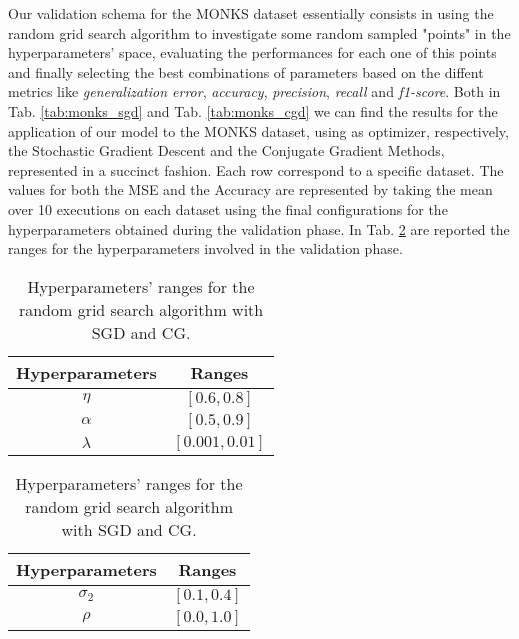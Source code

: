         Our validation schema for the MONKS dataset essentially consists in using the random grid
        search
        algorithm to investigate some random sampled "points" in the hyperparameters' space, evaluating the
        performances for each one of this points and finally selecting the best combinations of parameters
        based
        on the diffent metrics like \textit{generalization error}, \textit{accuracy}, \textit{precision},
        \textit{recall} and \textit{f1-score}. Both in Tab. \ref{tab:monks_sgd} and Tab.
        \ref{tab:monks_cgd} we can find the results for the application of our model to the MONKS dataset,
        using as optimizer, respectively, the Stochastic Gradient Descent and the Conjugate Gradient Methods,
        represented in a succinct fashion. Each row correspond to a specific dataset. The values for both the
        MSE and the Accuracy are represented by taking the mean over 10 executions on each dataset using
        the final configurations for the hyperparameters obtained during the validation phase.
        In Tab. \ref{tab:hyper_monk} are reported the ranges for the hyperparameters involved in the validation phase.

        \begin{table}[H]
          \centering
          \caption{Hyperparameters' ranges for the random grid search algorithm with SGD and CG.}
          \begin{minipage}{.4\textwidth}
              \centering
              \begin{tabular}{| c | c |}
                    \hline
                    Hyperparameters & Ranges\\
                    \hline
                    $\eta$ & $\left [0.6, 0.8 \right ]$ \\
                    \hline
                    $\alpha$ & $[0.5, 0.9]$ \\
                    \hline
                    $\lambda$ & $[0.001, 0.01]$ \\
                    \hline
              \end{tabular}
          \end{minipage}
          \begin{minipage}{.4\textwidth}
              \centering
              \begin{tabular}{| c | c |}
                    \hline
                    Hyperparameters & Ranges\\
                    \hline
                    $\sigma_2$ & $\left [0.1, 0.4 \right ]$ \\
                    \hline
                    $\rho$ & $[0.0, 1.0]$ \\
                    \hline
              \end{tabular}
            \end{minipage}
            \label{tab:hyper_monk}
        \end{table}

